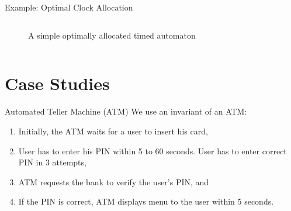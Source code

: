 \documentclass[10pt]{beamer}
\theoremstyle{plain}
\theoremstyle{definition}
\begin{document}
\begin{frame}{Example: Optimal Clock Allocation}
\begin{columns}[T]
\begin{column}{0.5\textwidth}
\begin{figure}
\begin{adjustbox}{max totalsize={.99\textwidth}{.75\textheight},center}
				\end{adjustbox}
			\caption{A simple optimally allocated timed automaton}
			\end{figure}
		\end{column}
	\end{columns}
\end{frame}

\section{Case Studies}

\begin{frame}{Automated Teller Machine (ATM)}
	We use an invariant of an ATM:
	\begin{enumerate}
		\item Initially, the ATM waits for a user to insert his card,
		\item User has to enter his PIN within 5 to 60 seconds. User has to enter correct PIN in 3 attempts,
		\item ATM requests the bank to verify the user's PIN, and
		\item If the PIN is correct, ATM displays menu to the user within 5 seconds.
	\end{enumerate}
\end{frame}
\end{document}
